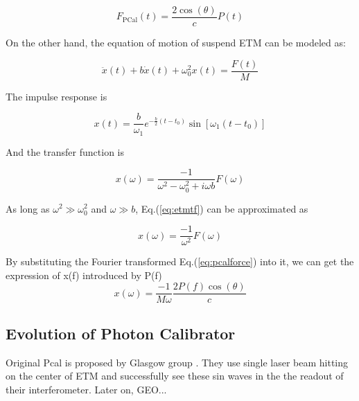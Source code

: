 \begin{equation}
\label{eq:pcalforce}
    F_\text{PCal}(t) = \frac{ 2 \cos(\theta) }{c} P(t) 
\end{equation}


On the other hand, the equation of motion of suspend ETM can be modeled as:

\begin{equation}
\label{eq:etmeom}
    \ddot{x}(t) + b \dot{x}(t) + \omega_0^2 x(t) = \frac{F(t)}{M} 
\end{equation}

%


The impulse response is

\begin{equation}
    x(t)=\frac{b}{\omega_1}e^{-\frac{b}{2}(t-t_0)}\sin[\omega_1 (t-t_0)]
\end{equation}


And the transfer function is

\begin{equation}
\label{eq:etmtf}
   x(\omega)=\frac{-1}{\omega^2 - \omega_0^2 + i \omega b}F(\omega)
\end{equation}

As long as $\omega^2 \gg \omega_0^2$ and $\omega \gg b$, Eq.(\ref{eq:etmtf}) can be approximated as

\begin{equation}
   x(\omega)=\frac{-1}{\omega^2}F(\omega)
\end{equation}

By substituting the Fourier transformed Eq.({\ref{eq:pcalforce}}) into it, we can get the expression of x(f) introduced by P(f)
\begin{equation}
\label{eq:pcaldisp}
    x(\omega) = \frac{-1}{M \omega} \frac{2  P(f) \cos(\theta)}{c} 
\end{equation}



\subsection{Evolution of Photon Calibrator}

Original Pcal is proposed by Glasgow group \cite{pcal:clubley2001}. They use single laser beam hitting on the center of ETM and successfully see these sin waves in the the readout of their interferometer. Later on, GEO...

